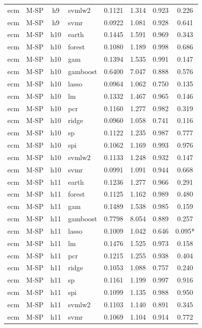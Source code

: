 \begin{ThreePartTable}
\begin{longtable}[t]{llclcccc}
ecm & M-SP & h9 & svmlw2 & 0.1121 & 1.314 & 0.923 & 0.226\\
ecm & M-SP & h9 & svmr & 0.0922 & 1.081 & 0.928 & 0.641\\
\addlinespace
ecm & M-SP & h10 & earth & 0.1445 & 1.591 & 0.969 & 0.343\\
ecm & M-SP & h10 & forest & 0.1080 & 1.189 & 0.998 & 0.686\\
ecm & M-SP & h10 & gam & 0.1394 & 1.535 & 0.991 & 0.147\\
ecm & M-SP & h10 & gamboost & 0.6400 & 7.047 & 0.888 & 0.576\\
ecm & M-SP & h10 & lasso & 0.0964 & 1.062 & 0.750 & 0.135\\
ecm & M-SP & h10 & lm & 0.1332 & 1.467 & 0.965 & 0.146\\
ecm & M-SP & h10 & pcr & 0.1160 & 1.277 & 0.982 & 0.319\\
ecm & M-SP & h10 & ridge & 0.0960 & 1.058 & 0.741 & 0.116\\
ecm & M-SP & h10 & sp & 0.1122 & 1.235 & 0.987 & 0.777\\
ecm & M-SP & h10 & spi & 0.1062 & 1.169 & 0.993 & 0.976\\
ecm & M-SP & h10 & svmlw2 & 0.1133 & 1.248 & 0.932 & 0.147\\
ecm & M-SP & h10 & svmr & 0.0991 & 1.091 & 0.944 & 0.668\\
\addlinespace
ecm & M-SP & h11 & earth & 0.1236 & 1.277 & 0.966 & 0.291\\
ecm & M-SP & h11 & forest & 0.1125 & 1.162 & 0.989 & 0.480\\
ecm & M-SP & h11 & gam & 0.1489 & 1.538 & 0.985 & 0.159\\
ecm & M-SP & h11 & gamboost & 0.7798 & 8.054 & 0.889 & 0.257\\
ecm & M-SP & h11 & lasso & 0.1009 & 1.042 & 0.646 & 0.095*\\
ecm & M-SP & h11 & lm & 0.1476 & 1.525 & 0.973 & 0.158\\
ecm & M-SP & h11 & pcr & 0.1215 & 1.255 & 0.938 & 0.404\\
ecm & M-SP & h11 & ridge & 0.1053 & 1.088 & 0.757 & 0.240\\
ecm & M-SP & h11 & sp & 0.1161 & 1.199 & 0.997 & 0.916\\
ecm & M-SP & h11 & spi & 0.1099 & 1.135 & 0.988 & 0.950\\
ecm & M-SP & h11 & svmlw2 & 0.1103 & 1.140 & 0.891 & 0.345\\
ecm & M-SP & h11 & svmr & 0.1069 & 1.104 & 0.914 & 0.772\\

\end{longtable}
\end{ThreePartTable}
